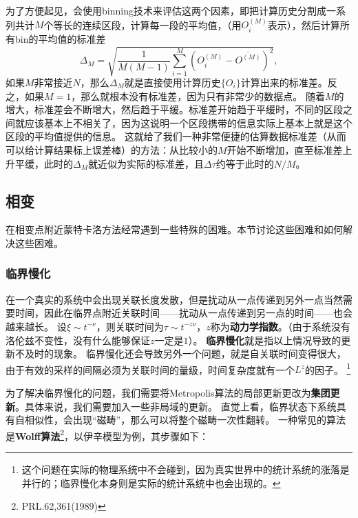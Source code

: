 \documentclass[hyperref, UTF8, a4paper]{ctexart}
\newcommand*{\concept}[1]{{\textbf{#1}}}
\begin{document}
为了方便起见，会使用binning技术来评估这两个因素，即把计算历史分割成一系列共计$M$个等长的连续区段，计算每一段的平均值，（用$O_i^{(M)}$表示），然后计算所有bin的平均值的标准差
\begin{equation}
    \Delta_M = \sqrt{\frac{1}{M(M-1)} \sum_{i=1}^M (O_i^{(M)} - \overline{O^{(M)}})^2},
\end{equation}
如果$M$非常接近$N$，那么$\Delta_M$就是直接使用计算历史$\{O_i\}$计算出来的标准差。反之，如果$M=1$，那么就根本没有标准差，因为只有非常少的数据点。
随着$M$的增大，标准差会不断增大，然后趋于平缓。标准差开始趋于平缓时，不同的区段之间就应该基本上不相关了，因为这说明一个区段携带的信息实际上基本上就是这个区段的平均值提供的信息。
这就给了我们一种非常便捷的估算数据标准差（从而可以给计算结果标上误差棒）的方法：从比较小的$M$开始不断增加，直至标准差上升平缓，此时的$\Delta_M$就近似为实际的标准差，且$\Delta \tau$约等于此时的$N/M$。

\subsection{相变}

在相变点附近蒙特卡洛方法经常遇到一些特殊的困难。本节讨论这些困难和如何解决这些困难。

\subsubsection{临界慢化}

在一个真实的系统中会出现关联长度发散，但是扰动从一点传递到另外一点当然需要时间，因此在临界点附近关联时间——扰动从一点传递到另一点的时间——也会越来越长。
设$\xi \sim t^{-\nu}$，则关联时间为$\tau \sim t^{-z \nu}$，$z$称为\concept{动力学指数}。（由于系统没有洛伦兹不变性，没有什么能够保证$z$一定是$1$）。
\concept{临界慢化}就是指以上情况导致的更新不及时的现象。
临界慢化还会导致另外一个问题，就是自关联时间变得很大，由于有效的采样的间隔必须为关联时间的量级，时间复杂度就有一个$L^{z}$的因子。%
\footnote{这个问题在实际的物理系统中不会碰到，因为真实世界中的统计系统的涨落是并行的；临界慢化本身则是实际的统计系统中也会出现的。}%

为了解决临界慢化的问题，我们需要将Metropolis算法的局部更新更改为\concept{集团更新}。具体来说，我们需要加入一些非局域的更新。
直觉上看，临界状态下系统具有自相似性，会出现“磁畴”，那么可以将整个磁畴一次性翻转。
一种常见的算法是\concept{Wolff算法}\footnote{PRL.62,361(1989)}，以伊辛模型为例，其步骤如下：
\end{document}
